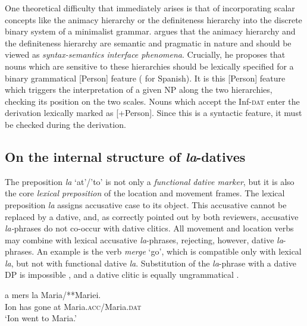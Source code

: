 \documentclass[output=paper,colorlinks,citecolor=brown,nonflat]{langsci/langscibook}
\begin{document}
One theoretical difficulty that immediately arises is that of incorporating scalar concepts like the animacy hierarchy or the definiteness hierarchy into the discrete binary system of a minimalist grammar. \citet{Richards2008} argues that the animacy hierarchy and the definiteness hierarchy are semantic and pragmatic in nature and should be viewed as \textit{syntax-semantics interface phenomena}. Crucially, he proposes that nouns which are sensitive to these hierarchies should be lexically specified for a binary grammatical [Person] feature (\citealt{Rodríguez-Mondoñedo2007} for Spanish). It is this [Person] feature which triggers the interpretation of a given NP along the two hierarchies, checking its position on the two scales. Nouns which accept the Inf-\textsc{dat} enter the derivation lexically marked as [+Person]. Since this is a syntactic feature, it must be checked during the derivation.

\subsection{ On the internal structure of \textit{la}-datives}

The preposition \textit{la} ‘at’/’to’ is not only a \textit{functional dative marker}, but it is also the core \textit{lexical preposition} of the location and movement frames. The lexical preposition \textit{la} assigns accusative case to its object. This accusative cannot be replaced by a dative, and, as correctly pointed out by both reviewers, accusative \textit{la-}phrases do not co-occur with dative clitics. All movement and location verbs may combine with lexical accusative \textit{la}{}-phrases, rejecting, however, dative \textit{la}{}-phrases. An example is the verb \textit{merge} ‘go’, which is compatible only with lexical \textit{la}, but not with functional dative \textit{la}. Substitution of the \textit{la}{}-phrase with a dative DP is impossible , and a dative clitic is equally ungrammatical .

\ea%
    \label{ex:cornilescu:9}
    \ea \label{ex:cornilescu:9a}
     {a} {mers} {la} Maria/**Mariei.	\\
    		Ion has gone at Maria.\textsc{acc}/Maria.\textsc{dat}\\
    \glt ‘Ion went to Maria.’
    \z
    \z
\end{document}
